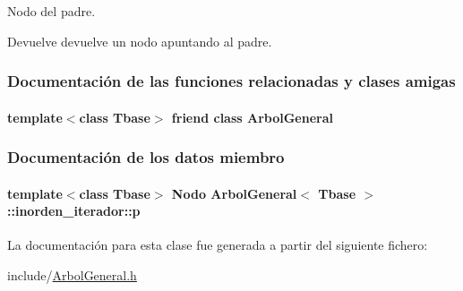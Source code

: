 Nodo del padre. 

\begin{DoxyReturn}{Devuelve}
devuelve un nodo apuntando al padre. 
\end{DoxyReturn}


\subsubsection{Documentación de las funciones relacionadas y clases amigas}
\paragraph[{\texorpdfstring{Arbol\+General}{ArbolGeneral}}]{\setlength{\rightskip}{0pt plus 5cm}template$<$class Tbase$>$ friend class {\bf Arbol\+General}\hspace{0.3cm}{\ttfamily [friend]}}\hypertarget{classArbolGeneral_1_1inorden__iterador_a9c06e31b7c3e0d4ee5b03003d32935a5}{}\label{classArbolGeneral_1_1inorden__iterador_a9c06e31b7c3e0d4ee5b03003d32935a5}


\subsubsection{Documentación de los datos miembro}
\paragraph[{\texorpdfstring{p}{p}}]{\setlength{\rightskip}{0pt plus 5cm}template$<$class Tbase$>$ {\bf Nodo} {\bf Arbol\+General}$<$ Tbase $>$\+::inorden\+\_\+iterador\+::p\hspace{0.3cm}{\ttfamily [private]}}\hypertarget{classArbolGeneral_1_1inorden__iterador_a77d9424a41cf406909fe131c11ccc856}{}\label{classArbolGeneral_1_1inorden__iterador_a77d9424a41cf406909fe131c11ccc856}


La documentación para esta clase fue generada a partir del siguiente fichero\+:\begin{DoxyCompactItemize}
\item 
include/\hyperlink{ArbolGeneral_8h}{Arbol\+General.\+h}\end{DoxyCompactItemize}
